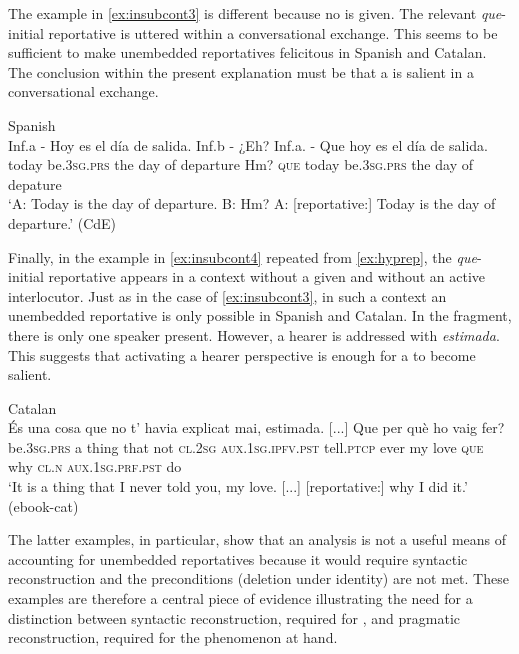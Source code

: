 The example in \eqref{ex:insubcont3}  is different because no \emph{} is given. The relevant \emph{que}-initial reportative is uttered within a conversational exchange. This seems to be sufficient to make unembedded reportatives felicitous  in Spanish and Catalan. The conclusion within the present explanation must be that a \emph{} is salient in a conversational exchange.


\ea\label{ex:insubcont3}

 Spanish\\ 
	\gll   Inf.a - Hoy es el día de salida. Inf.b - ¿Eh? Inf.a. - Que hoy es el día de salida. \\ 
	{}  { } today be.\textsc{3sg.prs} the day of departure { } {} Hm? {} {} \textsc{que} today be.\textsc{3sg.prs} the day of depature\\          
	\glt `A: Today is the day of  departure. B: Hm? A: [reportative:]  Today is the day of  departure.' (CdE)
\z

Finally, in the example in \eqref{ex:insubcont4} repeated from \eqref{ex:hyprep}, the \emph{que}-initial reportative appears in a context without a given \emph{} and without an active interlocutor. Just as in the case of \eqref{ex:insubcont3}, in such a context an unembedded reportative is only possible in Spanish and Catalan. In the fragment, there is only one speaker present. However, a hearer is addressed with  \emph{estimada}. This  suggests that activating a hearer perspective is enough for a \emph{} to become salient.


\ea\label{ex:insubcont4}
Catalan\\ 
\gll És una cosa que no t’ havia explicat mai, estimada. {[...]} Que {per què} ho vaig fer?  \\
	be.\textsc{3sg.prs} a thing that not \textsc{cl.2sg} \textsc{aux.1sg.ipfv.pst} tell.\textsc{ptcp} ever {my love} {}  \textsc{que} why \textsc{cl.n} \textsc{aux.1sg.prf.pst} do \\
	\glt `It is a thing that I never told you, my love. {[...]} [reportative:]  why I did it.'	(ebook-cat)
\z



The latter examples, in particular, show that an  analysis is not a useful means of accounting for unembedded reportatives because it would require syntactic reconstruction and the preconditions (deletion under identity) are not met. 
These examples are therefore a central piece of evidence illustrating the need for a distinction between syntactic reconstruction, required  for , and pragmatic reconstruction, required for the phenomenon at hand. 

